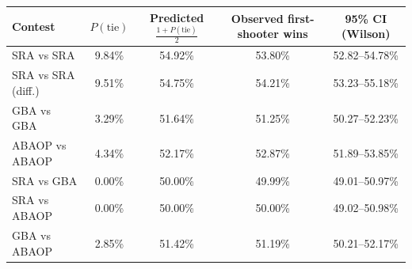 \begin{tabular}{|l|c|c|c|c|}
\hline
\rowcolor{sunglow}
Contest & $P(\text{tie})$ & Predicted $\frac{1+P(\text{tie})}{2}$ & Observed first-shooter wins & 95\% CI (Wilson) \\ \hline
SRA vs SRA & 9.84\% & 54.92\% & 53.80\% & 52.82--54.78\% \\ \hline
SRA vs SRA (diff.) & 9.51\% & 54.75\% & 54.21\% & 53.23--55.18\% \\ \hline
GBA vs GBA & 3.29\% & 51.64\% & 51.25\% & 50.27--52.23\% \\ \hline
ABAOP vs ABAOP & 4.34\% & 52.17\% & 52.87\% & 51.89--53.85\% \\ \hline
SRA vs GBA & 0.00\% & 50.00\% & 49.99\% & 49.01--50.97\% \\ \hline
SRA vs ABAOP & 0.00\% & 50.00\% & 50.00\% & 49.02--50.98\% \\ \hline
GBA vs ABAOP & 2.85\% & 51.42\% & 51.19\% & 50.21--52.17\% \\ \hline
\end{tabular}
